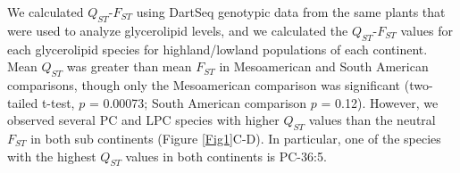 \documentclass[9pt,twocolumn,twoside,lineno]{BioRxiv}
\begin{document}
We calculated $Q_{ST}$-$F_{ST}$ using DartSeq genotypic data from the same plants that were used to analyze glycerolipid levels, and we calculated the $Q_{ST}$-$F_{ST}$ values for each glycerolipid species for highland/lowland populations of each continent. 
Mean $Q_{ST}$ was greater than mean $F_{ST}$ in Mesoamerican and South American comparisons, though only the Mesoamerican comparison was significant (two-tailed t-test, $p$ = 0.00073; South American comparison $p$ = 0.12).
However, we observed several PC and LPC species with higher $Q_{ST}$ values than the neutral $F_{ST}$ in both sub continents (Figure \ref{Fig1}C-D).
In particular, one of the species with the highest $Q_{ST}$ values in both continents is PC-36:5. 
%
\end{document}
